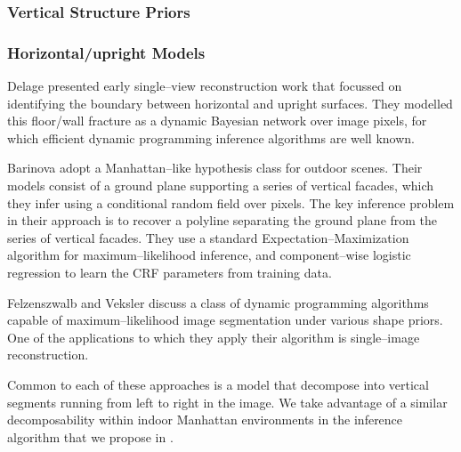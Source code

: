 \subsubsection{Vertical Structure Priors}


\subsubsection{Horizontal/upright Models}

Delage \etal \cite{Delage2006} presented early single--view
reconstruction work that focussed on identifying the boundary between
horizontal and upright surfaces. They modelled this floor/wall
fracture as a dynamic Bayesian network over image pixels, for which
efficient dynamic programming inference algorithms are well known.

Barinova \etal \cite{Barinova08} adopt a Manhattan--like hypothesis
class for outdoor scenes. Their models consist of a ground plane
supporting a series of vertical facades, which they infer using a
conditional random field over pixels. The key inference problem in
their approach is to recover a polyline separating the ground plane
from the series of vertical facades. They use a standard
Expectation--Maximization algorithm for maximum--likelihood inference,
and component--wise logistic regression to learn the CRF parameters
from training data.

Felzenszwalb and Veksler \cite{Felzenszwalb10} discuss a class of
dynamic programming algorithms capable of maximum--likelihood
image segmentation under various shape priors. One of the applications
to which they apply their algorithm is single--image reconstruction.

Common to each of these approaches is a model that decompose into
vertical segments running from left to right in the image. We take
advantage of a similar decomposability within indoor Manhattan
environments in the inference algorithm that we propose in
.


